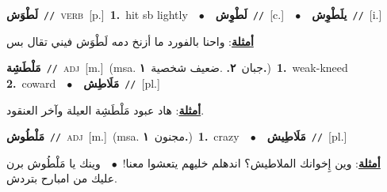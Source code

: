 \documentclass[10pt,a4paper,twoside]{article} %
\begin{document}
\begin{multicols}{2}
{\setlength\topsep{0pt}\textbf{\foreignlanguage{arabic}{لَطْوَش}}\ {\color{gray}\texttt{//}\color{black}}\ \textsc{verb}\ [p.]\ \textbf{1.}~hit sb lightly\ \ $\bullet$\ \ \setlength\topsep{0pt}\textbf{\foreignlanguage{arabic}{لَطْوِش}}\ {\color{gray}\texttt{//}\color{black}}\ [c.]\ \ $\bullet$\ \ \setlength\topsep{0pt}\textbf{\foreignlanguage{arabic}{يلَطْوِش}}\ {\color{gray}\texttt{//}\color{black}}\ [i.]\  \begin{flushright}\color{gray}\foreignlanguage{arabic}{\textbf{\underline{\foreignlanguage{arabic}{أمثلة}}}: واحنا بالفورد ما أزنخ دمه لَطْوَش فيني تقال بس}\end{flushright}\color{black}} \vspace{2mm}

{\setlength\topsep{0pt}\textbf{\foreignlanguage{arabic}{مَلْطَشِة}}\ {\color{gray}\texttt{//}\color{black}}\ \textsc{adj}\ [m.]\ \color{gray}(msa. \foreignlanguage{arabic}{جبان}~\foreignlanguage{arabic}{\textbf{٢.}}  .\foreignlanguage{arabic}{ضعيف شخصية}~\foreignlanguage{arabic}{\textbf{١.}})\color{black}\ \textbf{1.}~weak-kneed  \textbf{2.}~coward\ \ $\bullet$\ \ \setlength\topsep{0pt}\textbf{\foreignlanguage{arabic}{مَلَاطِش}}\ {\color{gray}\texttt{//}\color{black}}\ [pl.]\  \begin{flushright}\color{gray}\foreignlanguage{arabic}{\textbf{\underline{\foreignlanguage{arabic}{أمثلة}}}: هاد عبود مَلْطَشِة العيلة وآخر العنقود.}\end{flushright}\color{black}} \vspace{2mm}

{\setlength\topsep{0pt}\textbf{\foreignlanguage{arabic}{مَلْطُوش}}\ {\color{gray}\texttt{//}\color{black}}\ \textsc{adj}\ [m.]\ \color{gray}(msa. \foreignlanguage{arabic}{مجنون}~\foreignlanguage{arabic}{\textbf{١.}})\color{black}\ \textbf{1.}~crazy\ \ $\bullet$\ \ \setlength\topsep{0pt}\textbf{\foreignlanguage{arabic}{مَلَاطِيش}}\ {\color{gray}\texttt{//}\color{black}}\ [pl.]\  \begin{flushright}\color{gray}\foreignlanguage{arabic}{\textbf{\underline{\foreignlanguage{arabic}{أمثلة}}}: وين إِخوانك الملاطيش؟ اندهلم خليهم يتعشوا معنا!\ $\bullet$\ \  وينك يا مَلْطُوش برن عليك من امبارح بتردش.}\end{flushright}\color{black}} \vspace{2mm}


\end{multicols}
\end{document}
